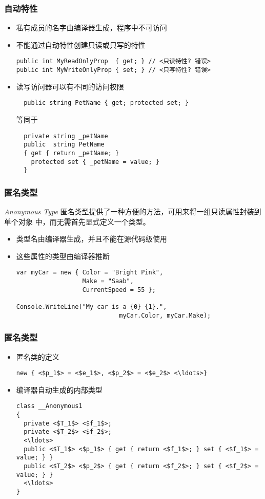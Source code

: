 \begin{frame}[fragile]
\frametitle{自动特性}
\begin{itemize}%
\setlength{\itemsep}{6pt plus 1pt}
\item 私有成员的名字由编译器生成，程序中不可访问
\item 不能通过自动特性创建只读或只写的特性
\begin{lstlisting}[escapeinside=<>]
public int MyReadOnlyProp  { get; } // <只读特性? 错误>
public int MyWriteOnlyProp { set; } // <只写特性? 错误>
\end{lstlisting}
\item 读写访问器可以有不同的访问权限
\begin{lstlisting}
  public string PetName { get; protected set; }
\end{lstlisting}
等同于
\begin{lstlisting}
  private string _petName
  public  string PetName
  { get { return _petName; }
    protected set { _petName = value; }
  }
\end{lstlisting}
\end{itemize}
\end{frame}


\begin{frame}[fragile]
\frametitle{匿名类型}
\begin{block}{\textit{Anonymous Type}}
  \CJKindent 匿名类型提供了一种方便的方法，可用来将一组只读属性封装到单个对象
  中，而无需首先显式定义一个类型。
\end{block}
\begin{itemize}
\item 类型名由编译器生成，并且不能在源代码级使用
\item 这些属性的类型由编译器推断
\begin{lstlisting}
var myCar = new { Color = "Bright Pink",
                  Make = "Saab",
                  CurrentSpeed = 55 };

Console.WriteLine("My car is a {0} {1}.",
                            myCar.Color, myCar.Make);
\end{lstlisting}
\end{itemize}
\end{frame}

\begin{frame}[fragile]
\frametitle{匿名类型}
\begin{itemize}
\item 匿名类的定义
\begin{lstlisting}[escapeinside=<>]
new { <$p_1$> = <$e_1$>, <$p_2$> = <$e_2$> <\ldots>}
\end{lstlisting}
\item 编译器自动生成的内部类型
\begin{lstlisting}[escapeinside=<>]
class __Anonymous1
{
  private <$T_1$> <$f_1$>;
  private <$T_2$> <$f_2$>;
  <\ldots>
  public <$T_1$> <$p_1$> { get { return <$f_1$>; } set { <$f_1$> = value; } }
  public <$T_2$> <$p_2$> { get { return <$f_2$>; } set { <$f_2$> = value; } }
  <\ldots>
}
\end{lstlisting}
\end{itemize}
\end{frame}

